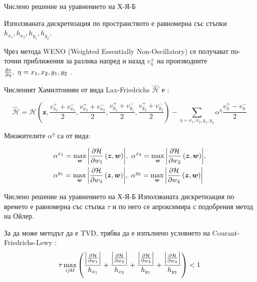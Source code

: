   \begin{frame}[t]{Числено решение на уравнението на Х-Я-Б}

Използваната дискретизация по пространството е равномерна със стъпки $h_{x_1}, h_{x_2}, h_{y_1}, h_{y_2}$.

Чрез метода WENO (Weighted Essentially Non-Oscillatory) се получават по-точни приближения за разлика напред и назад $v_{\eta}^{\pm}$ на производните $\pdv{v}{\eta},~ \eta = x_1, x_2, y_1, y_2$ \cite{Osher2003}.

  Численият Хамилтониян от вида Lax-Friedrichs $\hat{\mathcal{H}}$ е \cite{Osher2003}:
  \begin{small}
    \begin{equation*}
      \hat{\mathcal{H}} = \mathcal{H}\left(\boldsymbol{z}, \frac{v_{x_1}^++v_{x_1}^-}{2}, \frac{v_{x_2}^++v_{x_2}^-}{2}, \frac{v_{y_1}^++v_{y_1}^-}{2}, \frac{v_{y_2}^++v_{y_2}^-}{2}\right) - \sum_{\eta = x_1, x_2, y_1, y_2} \alpha^{\eta} \frac{v_{\eta}^+-v_{\eta}^-}{2}
    \end{equation*}
  \end{small}
  Множителите $\alpha^{\eta}$ са от вида:
  \begin{small}
    \begin{equation*}
      \begin{split}
        &\alpha^{x_1} = \max_{\boldsymbol{w}} \abs{\pdv{\mathcal{H}}{w_1}\left(\boldsymbol{z}, \boldsymbol{w}\right)},~
        \alpha^{x_2} = \max_{\boldsymbol{w}} \abs{\pdv{\mathcal{H}}{w_2}\left(\boldsymbol{z}, \boldsymbol{w}\right)}, \\
        &\alpha^{y_1} = \max_{\boldsymbol{w}} \abs{\pdv{\mathcal{H}}{w_3}\left(\boldsymbol{z}, \boldsymbol{w}\right)},~
        \alpha^{y_2} = \max_{\boldsymbol{w}} \abs{\pdv{\mathcal{H}}{w_4}\left(\boldsymbol{z}, \boldsymbol{w}\right)}
      \end{split}
    \end{equation*}
  \end{small}
\end{frame}

\begin{frame}[c]{Числено решение на уравнението на Х-Я-Б}
  Използваната дискретизация по времето е равномерна със стъпка $\tau$ и по него се апроксимира с подобрения метод на Ойлер.

  За да може методът да е TVD, трябва да е изпълнено условието на Courant-Friedrichs-Lewy \cite{Osher2003}:
  \begin{equation*}
    \tau \max_{ijkl} \left(\frac{\abs{\pdv{\mathcal{H}}{w_1}}}{h_{x_1}} + \frac{\abs{\pdv{\mathcal{H}}{w_2}}}{h_{x_2}} + \frac{\abs{\pdv{\mathcal{H}}{w_3}}}{h_{y_1}} + \frac{\abs{\pdv{\mathcal{H}}{w_4}}}{h_{y_2}}\right) < 1
  \end{equation*}
\end{frame}

